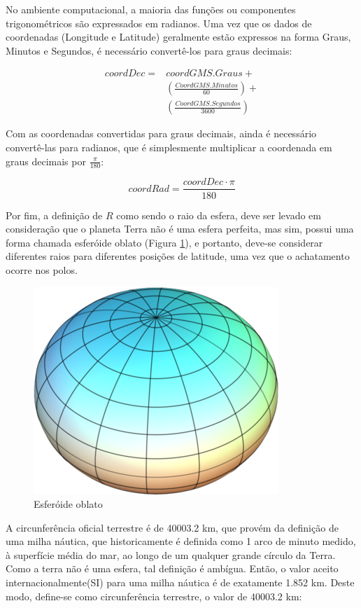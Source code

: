 No ambiente computacional, a maioria das funções ou componentes trigonométricos são expressados em radianos. Uma vez que os dados de coordenadas (Longitude e Latitude) geralmente estão expressos na forma Graus, Minutos e Segundos, é necessário convertê-los para graus decimais:

\[
\begin{matrix}
coordDec = 
& coordGMS.Graus +\\ 
& \left(\frac{CoordGMS.Minutos}{60}\right) +\\ 
& \left(\frac{CoordGMS.Segundos}{3600}\right)
\end{matrix}
\]

Com as coordenadas convertidas para graus decimais, ainda é necessário convertê-las para radianos, que é simplesmente multiplicar a coordenada em graus decimais por \(\frac{\pi}{180}\):

\[coordRad = \frac{coordDec \cdot \pi}{180}\]

Por fim, a definição de \(R\) como sendo o raio da esfera, deve ser levado em consideração que o planeta Terra não é uma esfera perfeita, mas sim, possui uma forma chamada esferóide oblato (Figura \ref{fig:OblateSpheroid}), e portanto, deve-se considerar diferentes raios para diferentes posições de latitude, uma vez que o achatamento ocorre nos polos.  

\begin{figure}[h]
	\centering	
	\includegraphics[scale=0.3]{Figuras/OblateSpheroid.PNG}
	\caption{Esferóide oblato}
	\label{fig:OblateSpheroid}
\end{figure}

A circunferência oficial terrestre é de 40003.2 km, que provém da definição de uma milha náutica, que historicamente é definida como 1 arco de minuto medido, à superfície média do mar, ao longo de um qualquer grande círculo da Terra. Como a terra não é uma esfera, tal definição é ambígua. Então, o valor aceito internacionalmente(SI) para uma milha náutica é de exatamente 1.852 km. Deste modo, define-se como circunferência terrestre, o valor de 40003.2 km:

